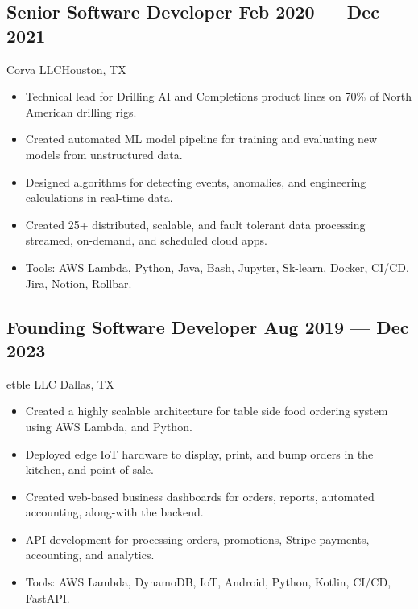 \documentclass[letter,10pt]{article}
\newcommand{\subtext}[1]{
	#1\par\vspace{-0.2cm}}
\newenvironment{zitemize}{
	\begin{itemize}\itemsep0pt \parskip0pt \parsep1pt}
	{\end{itemize}\vspace{-0.5cm}}
\begin{document}
	\vspace{0.3 cm}
	\subsection*{Senior Software Developer \hfill Feb 2020 --- Dec 2021} 
	\subtext{Corva LLC\hfill Houston, TX} 
	\begin{zitemize}
		\item Technical lead for Drilling AI and Completions product lines on 70\% of North American drilling rigs.
		\item Created automated ML model pipeline for training and evaluating new models from unstructured data.
		\item Designed algorithms for detecting events, anomalies, and engineering calculations in real-time data.
		\item Created 25+ distributed, scalable, and fault tolerant data processing streamed, on-demand, and scheduled cloud apps.
		\item Tools: AWS Lambda, Python, Java, Bash, Jupyter, Sk-learn, Docker, CI/CD, Jira, Notion, Rollbar.
	\end{zitemize}
	
	\vspace{0.3 cm}
	\subsection*{Founding Software Developer \hfill Aug 2019 --- Dec 2023} 
	\subtext{etble LLC \hfill Dallas, TX} 
	\begin{zitemize}
		\item Created a highly scalable architecture for table side food ordering system using AWS Lambda, and Python.
		\item Deployed edge IoT hardware to display, print, and bump orders in the kitchen, and point of sale.
		\item Created web-based business dashboards for orders, reports, automated accounting, along-with the backend.
		\item API development for processing orders, promotions, Stripe payments, accounting, and analytics.
		\item Tools: AWS Lambda, DynamoDB, IoT, Android, Python, Kotlin, CI/CD, FastAPI.
	\end{zitemize}
\end{document}
